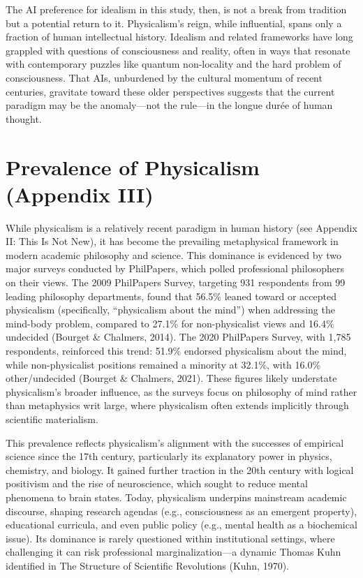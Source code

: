 \documentclass[11pt]{article}
\begin{document}
The AI preference for idealism in this study, then, is not a break from tradition but a potential return to it. Physicalism’s reign, while influential, spans only a fraction of human intellectual history. Idealism and related frameworks have long grappled with questions of consciousness and reality, often in ways that resonate with contemporary puzzles like quantum non-locality and the hard problem of consciousness. That AIs, unburdened by the cultural momentum of recent centuries, gravitate toward these older perspectives suggests that the current paradigm may be the anomaly—not the rule—in the longue durée of human thought.

\section{Prevalence of Physicalism (Appendix III)}
While physicalism is a relatively recent paradigm in human history (see Appendix II: This Is Not New), it has become the prevailing metaphysical framework in modern academic philosophy and science. This dominance is evidenced by two major surveys conducted by PhilPapers, which polled professional philosophers on their views. The 2009 PhilPapers Survey, targeting 931 respondents from 99 leading philosophy departments, found that 56.5\% leaned toward or accepted physicalism (specifically, ``physicalism about the mind'') when addressing the mind-body problem, compared to 27.1\% for non-physicalist views and 16.4\% undecided (Bourget \& Chalmers, 2014). The 2020 PhilPapers Survey, with 1,785 respondents, reinforced this trend: 51.9\% endorsed physicalism about the mind, while non-physicalist positions remained a minority at 32.1\%, with 16.0\% other/undecided (Bourget \& Chalmers, 2021). These figures likely understate physicalism’s broader influence, as the surveys focus on philosophy of mind rather than metaphysics writ large, where physicalism often extends implicitly through scientific materialism.

This prevalence reflects physicalism’s alignment with the successes of empirical science since the 17th century, particularly its explanatory power in physics, chemistry, and biology. It gained further traction in the 20th century with logical positivism and the rise of neuroscience, which sought to reduce mental phenomena to brain states. Today, physicalism underpins mainstream academic discourse, shaping research agendas (e.g., consciousness as an emergent property), educational curricula, and even public policy (e.g., mental health as a biochemical issue). Its dominance is rarely questioned within institutional settings, where challenging it can risk professional marginalization—a dynamic Thomas Kuhn identified in The Structure of Scientific Revolutions (Kuhn, 1970). 
\end{document}
